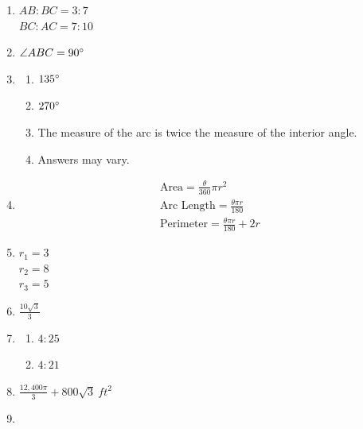 \documentclass{article}
\begin{document}
\begin{enumerate}
\begin{enumerate}
	\item 35.27 cm
	
	\end{enumerate}
	
\item $AB : BC = 3 : 7$ \\
	$BC : AC = 7 : 10$
	
\item $\angle ABC = 90 \degree$

\item

	\begin{enumerate}
	
	\item $135 \degree$
	
	\item $270 \degree$
	
	\item The measure of the arc is twice the measure of the interior angle.
	
	\item Answers may vary.
	
	\end{enumerate}
	
\item
	\begin{gather*}
	\text{Area} = \frac{\theta}{360} \pi r^2 \\
	\text{Arc Length} = \frac{\theta \pi r}{180} \\
	\text{Perimeter} = \frac{\theta \pi r}{180} + 2r
	\end{gather*}
	
\item $r_1 = 3$ \\
	$r_2 = 8$ \\
	$r_3 = 5$
	
\item $\frac{10 \sqrt{3}}{3}$

\item

	\begin{enumerate}
	
	\item $4 : 25$
	
	\item $4 : 21$
	
	\end{enumerate}

\item $\frac{12,400 \pi}{3} + 800 \sqrt{3} \ ft^2$

\item


\end{enumerate}
\end{document}
